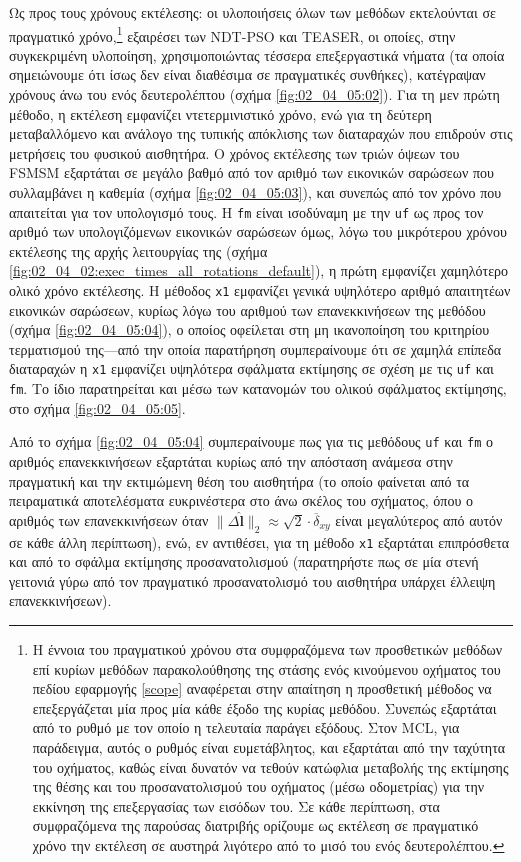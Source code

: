 Ως προς τους χρόνους εκτέλεσης: οι υλοποιήσεις όλων των μεθόδων εκτελούνται σε
πραγματικό χρόνο,\footnote{Η έννοια του πραγματικού χρόνου στα συμφραζόμενα των
προσθετικών μεθόδων επί κυρίων μεθόδων παρακολούθησης της στάσης ενός
κινούμενου οχήματος του πεδίου εφαρμογής \ref{scope} αναφέρεται στην απαίτηση η
προσθετική μέθοδος να επεξεργάζεται μία προς μία κάθε έξοδο της κυρίας μεθόδου.
Συνεπώς εξαρτάται από το ρυθμό με τον οποίο η τελευταία παράγει εξόδους.  Στον
MCL, για παράδειγμα, αυτός ο ρυθμός είναι ευμετάβλητος, και εξαρτάται από την
ταχύτητα του οχήματος, καθώς είναι δυνατόν να τεθούν κατώφλια μεταβολής της
εκτίμησης της θέσης και του προσανατολισμού του οχήματος (μέσω οδομετρίας) για
την εκκίνηση της επεξεργασίας των εισόδων του. Σε κάθε περίπτωση, στα
συμφραζόμενα της παρούσας διατριβής ορίζουμε ως εκτέλεση σε πραγματικό χρόνο
την εκτέλεση σε αυστηρά λιγότερο από το μισό του ενός δευτερολέπτου.}
εξαιρέσει των NDT-PSO και TEASER, οι οποίες, στην συγκεκριμένη υλοποίηση,
χρησιμοποιώντας τέσσερα επεξεργαστικά νήματα (τα οποία σημειώνουμε ότι ίσως δεν
είναι διαθέσιμα σε πραγματικές συνθήκες), κατέγραψαν χρόνους άνω του ενός
δευτερολέπτου (σχήμα \ref{fig:02_04_05:02}). Για τη μεν πρώτη μέθοδο, η
εκτέλεση εμφανίζει ντετερμινιστικό χρόνο, ενώ για τη δεύτερη μεταβαλλόμενο και
ανάλογο της τυπικής απόκλισης των διαταραχών που επιδρούν στις μετρήσεις του
φυσικού αισθητήρα. Ο χρόνος εκτέλεσης των τριών όψεων του FSMSM εξαρτάται σε
μεγάλο βαθμό από τον αριθμό των εικονικών σαρώσεων που συλλαμβάνει η καθεμία
(σχήμα \ref{fig:02_04_05:03}), και συνεπώς από τον χρόνο που απαιτείται για τον
υπολογισμό τους. Η \texttt{fm} είναι ισοδύναμη με την \texttt{uf} ως προς τον
αριθμό των υπολογιζόμενων εικονικών σαρώσεων όμως, λόγω του μικρότερου χρόνου
εκτέλεσης της αρχής λειτουργίας της (σχήμα
\ref{fig:02_04_02:exec_times_all_rotations_default}), η πρώτη εμφανίζει
χαμηλότερο ολικό χρόνο εκτέλεσης. Η μέθοδος \texttt{x1} εμφανίζει γενικά
υψηλότερο αριθμό απαιτητέων εικονικών σαρώσεων, κυρίως λόγω του αριθμού των
επανεκκινήσεων της μεθόδου (σχήμα \ref{fig:02_04_05:04}), ο οποίος οφείλεται
στη μη ικανοποίηση του κριτηρίου τερματισμού της---από την οποία παρατήρηση
συμπεραίνουμε ότι σε χαμηλά επίπεδα διαταραχών η \texttt{x1} εμφανίζει
υψηλότερα σφάλματα εκτίμησης σε σχέση με τις \texttt{uf} και \texttt{fm}. Το
ίδιο παρατηρείται και μέσω των κατανομών του ολικού σφάλματος εκτίμησης, στο
σχήμα \ref{fig:02_04_05:05}.

Από το σχήμα \ref{fig:02_04_05:04} συμπεραίνουμε πως για τις μεθόδους
\texttt{uf} και \texttt{fm} ο αριθμός επανεκκινήσεων εξαρτάται κυρίως από την
απόσταση ανάμεσα στην πραγματική και την εκτιμώμενη θέση του αισθητήρα (το
οποίο φαίνεται από τα πειραματικά αποτελέσματα ευκρινέστερα στο άνω σκέλος του
σχήματος, όπου ο αριθμός των επανεκκινήσεων όταν $\|\Delta \hat{\bm{l}}\|_2
\approx \sqrt{2}\cdot\overline{\delta}_{xy}$ είναι μεγαλύτερος από αυτόν σε
κάθε άλλη περίπτωση), ενώ, εν αντιθέσει, για τη μέθοδο \texttt{x1} εξαρτάται
επιπρόσθετα και από το σφάλμα εκτίμησης προσανατολισμού (παρατηρήστε πως σε μία
στενή γειτονιά γύρω από τον πραγματικό προσανατολισμό του αισθητήρα υπάρχει
έλλειψη επανεκκινήσεων).


